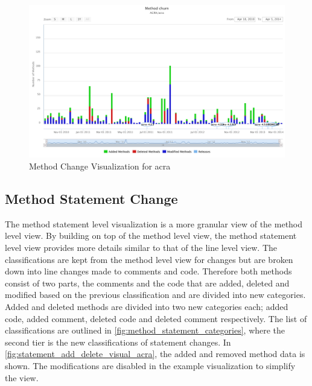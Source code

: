 \begin{landscape}
\thispagestyle{empty}
 \begin{figure}
  \centering
    \includegraphics[width=1.5\textwidth]{images/method_visual_acra}
    \caption{Method Change Visualization for acra}
    \label{fig:method_visual_acra}
 \end{figure}
\end{landscape}
\thispagestyle{plain}


\subsection{Method Statement Change}
\label{subsec:method_statement_change}

The method statement level visualization is a more granular view of the method level view. By building on top of the method level view, the method statement level view provides more details similar to that of the line level view. The classifications are kept from the method level view for changes but are broken down into line changes made to comments and code. Therefore both methods consist of two parts, the comments and the code that are added, deleted and modified based on the previous classification and are divided into new categories. Added and deleted methods are divided into two new categories each; added code, added comment, deleted code and deleted comment respectively. The list of classifications are outlined in \autoref{fig:method_statement_categories}, where the second tier is the new classifications of statement changes. In \autoref{fig:statement_add_delete_visual_acra}, the added and removed method data is shown. The modifications are disabled in the example visualization to simplify the view.

